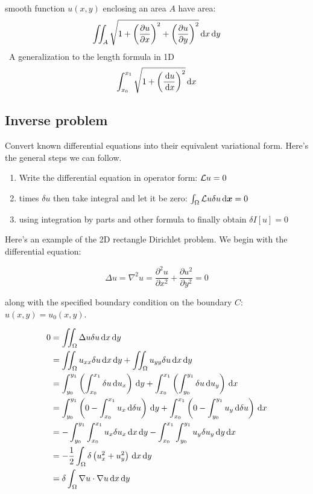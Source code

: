 \documentclass{article}
\begin{document}
\begin{remark}
    smooth function \(u(x,y)\) enclosing an area \(A\) have area:
    \[\iint_A \sqrt{1+\left( \frac{\partial u}{\partial x} \right)^2+\left( \frac{\partial u}{\partial y} \right)^2}\,\mathrm{d} x\,\mathrm{d} y\]\
    A generalization to the length formula in 1D
    \[\int_{x_0}^{x_1} \sqrt{1+\left( \frac{\,\mathrm{d} u}{\,\mathrm{d} x} \right)^2}\,\mathrm{d} x\]
\end{remark}

\subsection{Inverse problem}

Convert known differential equations into their equivalent variational form. Here's the general steps we can follow.

\begin{enumerate}
    \item Write the differential equation in operator form: \(\mathcal{L} u=0\)
    \item times \(\delta u\) then take integral and let it be zero: \(\int_\Omega \mathcal{L} u\delta u\,\mathrm{d} \boldsymbol{x}=0\)
    \item using integration by parts and other formula to finally obtain \(\delta I[u]=0\)
\end{enumerate}

Here's an example of the 2D rectangle Dirichlet problem. We begin with the differential equation:

\[\Delta u=\nabla^2 u=\frac{\partial ^2 u}{\partial x^2}+\frac{\partial u^2}{\partial y^2}=0\]

along with the specified boundary condition on the boundary \(C\): \(u(x,y)=u_0(x,y)\).

\begin{equation*}
    \begin{split}
        0 &=  \iint_\Omega \Delta u\delta u\,\mathrm{d} x\,\mathrm{d} y\\
        &= \iint_\Omega u_{xx} \delta u\,\mathrm{d} x\,\mathrm{d} y + \iint_\Omega u_{yy} \delta u\,\mathrm{d} x\,\mathrm{d} y\\
        &= \int_{y_0} ^{y_1} \left( \int_{x_0} ^{x_1} \delta u\,\mathrm{d} u_x \right) \,\mathrm{d} y+\int_{x_0} ^{x_1} \left( \int_{y_0} ^{y_1} \delta u\,\mathrm{d} u_y \right) \,\mathrm{d} x\\
        &= \int_{y_0} ^{y_1} \left( 0- \int_{x_0} ^{x_1} u_x \,\mathrm{d} \delta u \right)\,\mathrm{d} y + \int_{x_0} ^{x_1} \left( 0- \int_{y_0} ^{y_1} u_y \,\mathrm{d} \delta u \right)\,\mathrm{d} x\\
        &=  -\int_{y_0} ^{y_1} \int_{x_0} ^{x_1} u_x\delta u_x\,\mathrm{d} x \,\mathrm{d} y- \int_{x_0} ^{x_1}\int_{y_0} ^{y_1}  u_y\delta u_y\,\mathrm{d} y\,\mathrm{d} x\\
        &= -\frac{1}{2}\int_\Omega \delta\left( u_x^2+u_y^2 \right)\,\mathrm{d} x\,\mathrm{d} y\\
        &= \delta \int_\Omega \nabla u\cdot \nabla u \,\mathrm{d} x\,\mathrm{d} y
    \end{split}
\end{equation*}
\end{document}
